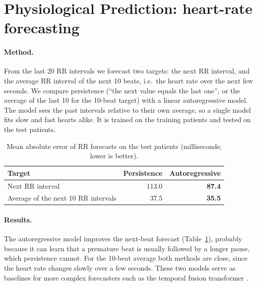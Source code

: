 \section{Physiological Prediction: heart-rate forecasting}
\label{section:forecast}

\paragraph{Method.} From the last 20 RR intervals we forecast two targets: the next RR interval, and the average RR interval of the next 10 beats, i.e.\ the heart rate over the next few seconds. We compare persistence (``the next value equals the last one'', or the average of the last 10 for the 10-beat target) with a linear autoregressive model. The model sees the past intervals relative to their own average, so a single model fits slow and fast hearts alike. It is trained on the training patients and tested on the test patients.

\begin{table}[H]
\caption{Mean absolute error of RR forecasts on the test patients (milliseconds; lower is better).}
\label{tab:forecast}
\centering
\small
{}
\begin{tabular}{@{}lrr@{}}
\toprule
\textbf{Target} & \textbf{Persistence} & \textbf{Autoregressive} \\
\midrule
Next RR interval & 113.0 & \textbf{87.4} \\
Average of the next 10 RR intervals & 37.5 & \textbf{35.5} \\
\bottomrule
\end{tabular}
\end{table}

\paragraph{Results.} The autoregressive model improves the next-beat forecast (Table~\ref{tab:forecast}), probably because it can learn that a premature beat is usually followed by a longer pause, which persistence cannot. For the 10-beat average both methods are close, since the heart rate changes slowly over a few seconds. These two models serve as baselines for more complex forecasters such as the temporal fusion transformer \cite{lim2021temporal}.
